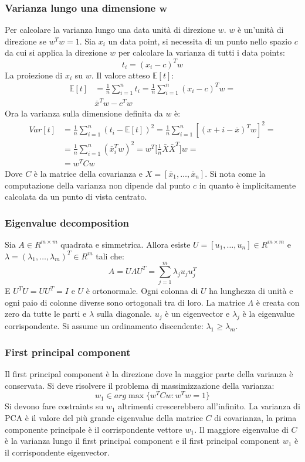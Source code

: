 		\subsubsection{Varianza lungo una dimensione $\mathbf{w}$}
		Per calcolare la varianza lungo una data unit\`a di direzione $w$.
		$w$ \`e un'unit\`a di direzione se $w^Tw=1$.
		Sia $x_i$ un data point, si necessita di un punto nello spazio $c$ da cui si applica la direzione $w$ per calcolare la varianza di tutti i data points:
		$$t_i = (x_i-c)^Tw$$
		La proiezione di $x_i$ su $w$.
		Il valore atteso $\mathbb{E}[t]$:
		\begin{align*}
			\mathbb{E}[t] &= \frac{1}{n}\sum\limits_{i=1}^nt_i = \frac{1}{n}\sum\limits_{i=1}^n(x_i-c)^Tw=\\
			&\bar{x}^Tw-c^Tw
		\end{align*}
		Ora la varianza sulla dimensione definita da $w$ \`e:
		\begin{align*}
			Var[t] &= \frac{1}{n}\sum\limits_{i = 1}^n(t_i -\mathbb{E}[t])^2 = \frac{1}{n}\sum\limits_{i=1}^n[(x+i-\bar{x})^Tw]^2=\\
						 &=\frac{1}{n}\sum\limits_{i=1}^n(\bar{x}_i^Tw)^2 = w^T\bigl[\frac{1}{n}\bar{X}\bar{X}^T\bigr]w=\\
						 &=w^TCw
		\end{align*}
		Dove $C$ \`e la matrice della covarianza e $X = [\bar{x}_1,\dots,\bar{x}_n]$.
		Si nota come la computazione della varianza non dipende dal punto $c$ in quanto \`e implicitamente calcolata da un punto di vista centrato.

		\subsubsection{Eigenvalue decomposition}
		Sia $A\in R^{m\times m}$ quadrata e simmetrica.
		Allora esiste $U=[u_1,\dots,u_n]\in R^{m\times m}$ e $\lambda=(\lambda_1,\dots,\lambda_m)^T\in R^m$ tali che:
		$$A = U\Lambda U^T=\sum\limits_{j=1}^m\lambda_ju_ju_j^T$$
		E $U^TU=UU^T=I$ e $U$ \`e ortonormale.
		Ogni colonna di $U$ ha lunghezza di unit\`a e ogni paio di colonne diverse sono ortogonali tra di loro.
		La matrice $\Lambda$ \`e creata con zero da tutte le parti e $\lambda$ sulla diagonale.
		$u_j$ \`e un eigenvector e $\lambda_j$ \`e la eigenvalue corrispondente.
		Si assume un ordinamento discendente: $\lambda_1\ge \lambda_m$.

		\subsubsection{First principal component}
		Il first principal component \`e la direzione dove la maggior parte della varianza \`e conservata.
		Si deve risolvere il problema di massimizzazione della varianza:
		$$w_1\in arg\max\{w^TCw:w^Tw=1\}$$
		Si devono fare costraints su $w_1$ altrimenti crescerebbero all'infinito.
		La varianza di PCA \`e il valore del pi\`u grande eigenvalue della matrice $C$ di covarianza, la prima componente principale \`e il corrispondente vettore $w_1$.
		Il maggiore eigenvalue di $C$ \`e la varianza lungo il first principal component e il first principal component $w_1$ \`e il corrispondente eigenvector.

